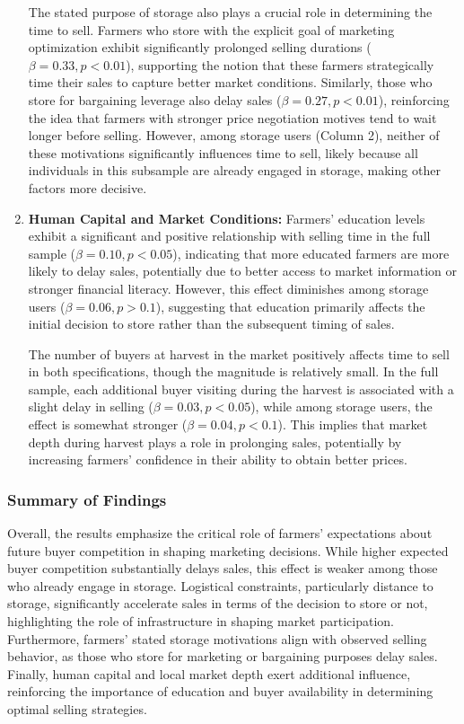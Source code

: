 \begin{enumerate}
    The stated purpose of storage also plays a crucial role in determining the time to sell. Farmers who store with the explicit goal of marketing optimization exhibit significantly prolonged selling durations (\(\beta = 0.33, p<0.01\)), supporting the notion that these farmers strategically time their sales to capture better market conditions. Similarly, those who store for bargaining leverage also delay sales (\(\beta = 0.27, p<0.01\)), reinforcing the idea that farmers with stronger price negotiation motives tend to wait longer before selling. However, among storage users (Column 2), neither of these motivations significantly influences time to sell, likely because all individuals in this subsample are already engaged in storage, making other factors more decisive.
    
    \item \textbf{Human Capital and Market Conditions:} Farmers' education levels exhibit a significant and positive relationship with selling time in the full sample (\(\beta = 0.10, p<0.05\)), indicating that more educated farmers are more likely to delay sales, potentially due to better access to market information or stronger financial literacy. However, this effect diminishes among storage users (\(\beta = 0.06, p>0.1\)), suggesting that education primarily affects the initial decision to store rather than the subsequent timing of sales.
    
    The number of buyers at harvest in the market positively affects time to sell in both specifications, though the magnitude is relatively small. In the full sample, each additional buyer visiting during the harvest is associated with a slight delay in selling (\(\beta = 0.03, p<0.05\)), while among storage users, the effect is somewhat stronger (\(\beta = 0.04, p<0.1\)). This implies that market depth during harvest plays a role in prolonging sales, potentially by increasing farmers' confidence in their ability to obtain better prices.
\end{enumerate}

\subsubsection{Summary of Findings}
\noindent 
Overall, the results emphasize the critical role of farmers' expectations about future buyer competition in shaping marketing decisions. While higher expected buyer competition substantially delays sales, this effect is weaker among those who already engage in storage. Logistical constraints, particularly distance to storage, significantly accelerate sales in terms of the decision to store or not, highlighting the role of infrastructure in shaping market participation. Furthermore, farmers' stated storage motivations align with observed selling behavior, as those who store for marketing or bargaining purposes delay sales. Finally, human capital and local market depth exert additional influence, reinforcing the importance of education and buyer availability in determining optimal selling strategies.



